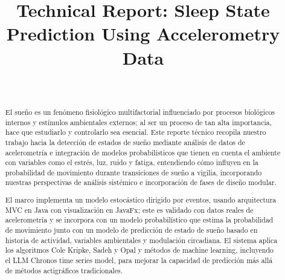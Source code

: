 \documentclass[conference]{IEEEtran}
\begin{document}
\title{Technical Report: Sleep State Prediction Using Accelerometry Data}

\author{
	\\
	\and
}

\maketitle

\begin{abstract}
	El sueño es un fenómeno fisiológico multifactorial influenciado por procesos biológicos internos y estímulos ambientales externos; al ser un proceso de tan alta importancia, hace que estudiarlo y controlarlo sea esencial. Este reporte técnico recopila nuestro trabajo hacia la detección de estados de sueño mediante análisis de datos de acelerometría e integración de modelos probabilísticos que tienen en cuenta el ambiente con variables como el estrés, luz, ruido y fatiga, entendiendo cómo influyen en la probabilidad de movimiento durante transiciones de sueño a vigilia, incorporando nuestras perspectivas de análisis sistémico e incorporación de fases de diseño modular. 

El marco implementa un modelo estocástico dirigido por eventos, usando arquitectura MVC en Java con visualización en JavaFx; este es validado con datos reales de acelerometría y se incorpora con un modelo probabilístico que estima la probabilidad de movimiento junto con un modelo de predicción de estado de sueño basado en historia de actividad, variables ambientales y modulación circadiana. El sistema aplica los algoritmos Cole Kripke, Sadeh y Opal y métodos de machine learning, incluyendo el LLM Chronos time series model, para mejorar la capacidad de predicción más allá de métodos actigráficos tradicionales.
\end{abstract}
\end{document}

